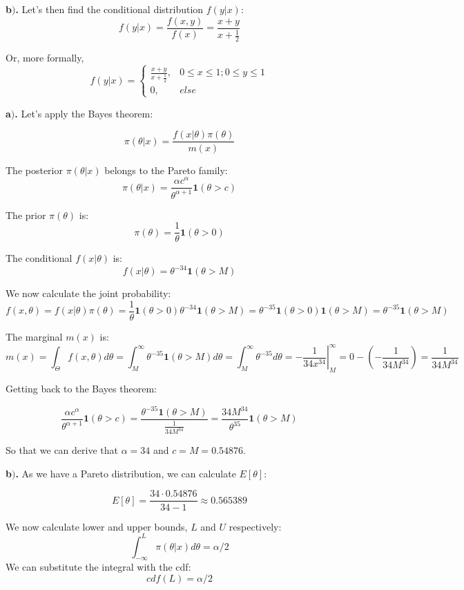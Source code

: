 \documentclass[a4 paper]{article}
\begin{document}
\textbf{b$)$.} Let's then find the 
conditional distribution $f(y|x)$:
$$
f(y|x)=\frac{f(x,y)}{f(x)}=\frac{x+y}{x+\frac{1}{2}}
$$

Or, more formally,
$$
f(y|x)=\begin{cases}
\frac{x+y}{x+\frac{1}{2}}, & 0\leq x\leq1;0\leq y\leq1\\
0, & else
\end{cases}
$$



\textbf{a$)$.} Let's apply the Bayes theorem:

$$
\pi(\theta|x)=\frac{f(x|\theta)\pi(\theta)}{m(x)}
$$

The posterior $\pi(\theta|x)$ belongs to the Pareto family:
$$
\pi(\theta|x)=\frac{\alpha c^{\alpha}}{\theta^{\alpha+1}} \mathbf{1}(\theta>c)
$$ 

The prior $\pi(\theta)$ is:
$$
\pi(\theta)=\frac{1}{\theta} \mathbf{1}(\theta>0)
$$

The conditional $f(x|\theta)$ is:
$$
f(x|\theta) = \theta^{-34} \mathbf{1}(\theta>M)
$$

We now calculate the joint probability:
$$
f(x,\theta) = f(x|\theta)\pi(\theta)=\frac{1}{\theta} \mathbf{1}(\theta>0)\theta^{-34} \mathbf{1}(\theta>M) = \theta^{-35} \mathbf{1}(\theta>0)\mathbf{1}(\theta>M) = \theta^{-35}\mathbf{1}(\theta>M)
$$

The marginal $m(x)$ is:
$$
m(x)=\int_{\varTheta}f(x,\theta)d\theta=\int_{M}^{\infty}\theta^{-35}\mathbf{1}(\theta>M)d\theta=\int_{M}^{\infty}\theta^{-35}d\theta=\left.-\frac{1}{34x^{34}}\right|_{M}^{\infty}=0-\left(-\frac{1}{34M^{34}}\right)=\frac{1}{34M^{34}}
$$

Getting back to the Bayes theorem:

$$
\frac{\alpha c^{\alpha}}{\theta^{\alpha+1}} \mathbf{1}(\theta>c) = \frac{\theta^{-35}\mathbf{1}(\theta>M)}{\frac{1}{34M^{34}}}=\frac{34M^{34}}{\theta^{35}}\mathbf{1}(\theta>M)
$$

So that we can derive that $\alpha=34$ and $c=M=0.54876$. \newline


\textbf{b$)$.} As we have a Pareto distribution, we can calculate 
$E[\theta]$:

$$
E[\theta]=\frac{34\cdot0.54876}{34-1}\approx0.565389
$$

We now calculate lower and upper bounds, $L$ and $U$ respectively:
$$
\int_{-\infty}^{L} \pi(\theta | x) d \theta=\alpha / 2
$$
We can substitute the integral with the cdf:
$$
cdf(L) =\alpha / 2
$$
\end{document}
